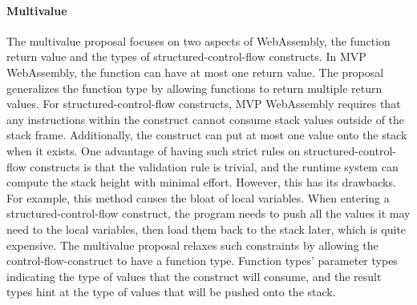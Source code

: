 \paragraph{Multivalue}
The multivalue proposal focuses on two aspects of WebAssembly, the function
return value and the types of structured-control-flow constructs. In MVP
WebAssembly, the function can have at most one return value. The proposal
generalizes the function type by allowing functions to return multiple return
values. For structured-control-flow constructs, MVP WebAssembly requires that
any instructions within the construct cannot consume stack values outside of the
stack frame. Additionally, the construct can put at most one value
onto the stack when it exists. One advantage of having such strict rules on
structured-control-flow constructs is that the validation rule is trivial, and
the runtime system can compute the stack height with minimal effort. However,
this has its drawbacks. For example, this method causes the bloat of local
variables. When entering a structured-control-flow construct, the program needs
to push all the values it may need to the local variables, then load them back
to the stack later, which is quite expensive. The multivalue proposal relaxes
such constraints by allowing the control-flow-construct to have a function type.
Function types' parameter types indicating the type of values that the construct
will consume, and the result types hint at the type of values that will be
pushed onto the stack.

